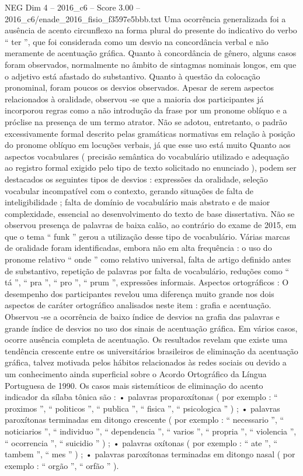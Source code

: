 \begin{textsample}{NEG Dim 4 – 2016\_c6 – Score 3.00 – 2016\_c6/enade\_2016\_fisio\_f3597e5bbb.txt}
Uma ocorrência generalizada foi a ausência de acento circunflexo na forma plural do presente do indicativo do verbo “ ter ”, que foi considerada como um desvio na concordância verbal e não meramente de acentuação gráfica.
Quanto à concordância de gênero, alguns casos foram observados, normalmente no âmbito de sintagmas nominais longos, em que o adjetivo está afastado do substantivo.
Quanto à questão da colocação pronominal, foram poucos os desvios observados.
Apesar de serem aspectos relacionados à oralidade, observou -se que a maioria dos participantes já incorporou regras como a não introdução da frase por um pronome oblíquo e a próclise na presença de um termo atrator.
Não se adotou, entretanto, o padrão excessivamente formal descrito pelas gramáticas normativas em relação à posição do pronome oblíquo em locuções verbais, já que esse uso está muito Quanto aos aspectos vocabulares ( precisão semântica do vocabulário utilizado e adequação ao registro formal exigido pelo tipo de texto solicitado no enunciado ), podem ser destacados os seguintes tipos de desvios : expressões da oralidade, seleção vocabular incompatível com o contexto, gerando situações de falta de inteligibilidade ; falta de domínio de vocabulário mais abstrato e de maior complexidade, essencial ao desenvolvimento do texto de base dissertativa.
Não se observou presença de palavras de baixa calão, ao contrário do exame de 2015, em que o tema “ funk ” gerou a utilização desse tipo de vocabulário.
Várias marcas de oralidade foram identificadas, embora não em alta frequência : o uso do pronome relativo “ onde ” como relativo universal, falta de artigo definido antes de substantivo, repetição de palavras por falta de vocabulário, reduções como “ tá ”, “ pra ”, “ pro ”, “ prum ”, expressões informais.
Aspectos ortográficos : O desempenho dos participantes revelou uma diferença muito grande nos dois aspectos de caráter ortográfico analisados neste item : grafia e acentuação.
Observou -se a ocorrência de baixo índice de desvios na grafia das palavras e grande índice de desvios no uso dos sinais de acentuação gráfica.
Em vários casos, ocorre ausência completa de acentuação.
Os resultados revelam que existe uma tendência crescente entre os universitários brasileiros de eliminação da acentuação gráfica, talvez motivada pelos hábitos relacionados às redes sociais ou devido a um conhecimento ainda superficial sobre o Acordo Ortográfico da Língua Portuguesa de 1990.
Os casos mais sistemáticos de eliminação do acento indicador da sílaba tônica são : • palavras proparoxítonas ( por exemplo : “ proximos ”, “ politicos ”, “ publica ”, “ fisica ”, “ psicologica ” ) ; • palavras paroxítonas terminadas em ditongo crescente ( por exemplo : “ necessario ”, “ noticiarios ”, “ individuo ”, “ dependencia ”, “ varios ”, “ propria ”, “ violencia ”, “ ocorrencia ”, “ suicidio ” ) ; • palavras oxítonas ( por exemplo : “ ate ”, “ tambem ”, “ mes ” ) ; • palavras paroxítonas terminadas em ditongo nasal ( por exemplo : “ orgão ”, “ orfão ” ).

\end{textsample}
